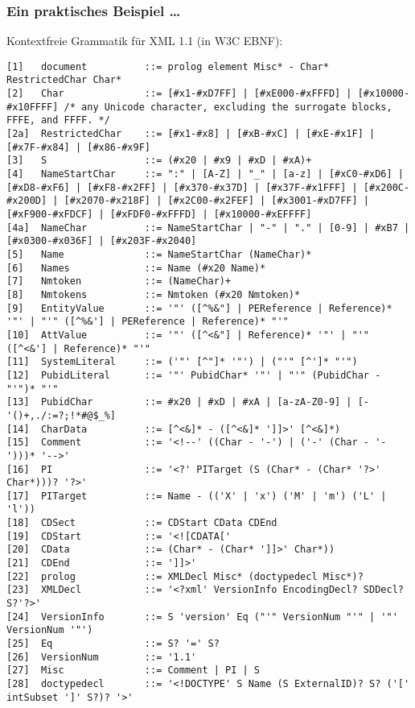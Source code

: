 \documentclass[onlymath]{beamer}
\begin{document}
\begin{frame}[fragile]\frametitle{Ein praktisches Beispiel \ldots}

\pause
Kontextfreie Grammatik für XML 1.1 (in W3C EBNF):

\linespread{0.6}
\fontsize{2.3}{4}\selectfont
\begin{verbatim}
[1]   document          ::= prolog element Misc* - Char* RestrictedChar Char*
[2]   Char              ::= [#x1-#xD7FF] | [#xE000-#xFFFD] | [#x10000-#x10FFFF] /* any Unicode character, excluding the surrogate blocks, FFFE, and FFFF. */
[2a]  RestrictedChar    ::= [#x1-#x8] | [#xB-#xC] | [#xE-#x1F] | [#x7F-#x84] | [#x86-#x9F]
[3]   S                 ::= (#x20 | #x9 | #xD | #xA)+
[4]   NameStartChar     ::= ":" | [A-Z] | "_" | [a-z] | [#xC0-#xD6] | [#xD8-#xF6] | [#xF8-#x2FF] | [#x370-#x37D] | [#x37F-#x1FFF] | [#x200C-#x200D] | [#x2070-#x218F] | [#x2C00-#x2FEF] | [#x3001-#xD7FF] | [#xF900-#xFDCF] | [#xFDF0-#xFFFD] | [#x10000-#xEFFFF]
[4a]  NameChar          ::= NameStartChar | "-" | "." | [0-9] | #xB7 | [#x0300-#x036F] | [#x203F-#x2040]
[5]   Name              ::= NameStartChar (NameChar)*
[6]   Names             ::= Name (#x20 Name)*
[7]   Nmtoken           ::= (NameChar)+
[8]   Nmtokens          ::= Nmtoken (#x20 Nmtoken)*
[9]   EntityValue       ::= '"' ([^%&"] | PEReference | Reference)* '"' | "'" ([^%&'] | PEReference | Reference)* "'"
[10]  AttValue          ::= '"' ([^<&"] | Reference)* '"' | "'" ([^<&'] | Reference)* "'"
[11]  SystemLiteral     ::= ('"' [^"]* '"') | ("'" [^']* "'")
[12]  PubidLiteral      ::= '"' PubidChar* '"' | "'" (PubidChar - "'")* "'"
[13]  PubidChar         ::= #x20 | #xD | #xA | [a-zA-Z0-9] | [-'()+,./:=?;!*#@$_%]
[14]  CharData          ::= [^<&]* - ([^<&]* ']]>' [^<&]*)
[15]  Comment           ::= '<!--' ((Char - '-') | ('-' (Char - '-')))* '-->'
[16]  PI                ::= '<?' PITarget (S (Char* - (Char* '?>' Char*)))? '?>'
[17]  PITarget          ::= Name - (('X' | 'x') ('M' | 'm') ('L' | 'l'))
[18]  CDSect            ::= CDStart CData CDEnd
[19]  CDStart           ::= '<![CDATA['
[20]  CData             ::= (Char* - (Char* ']]>' Char*))
[21]  CDEnd             ::= ']]>'
[22]  prolog            ::= XMLDecl Misc* (doctypedecl Misc*)?
[23]  XMLDecl           ::= '<?xml' VersionInfo EncodingDecl? SDDecl? S?'?>'
[24]  VersionInfo       ::= S 'version' Eq ("'" VersionNum "'" | '"' VersionNum '"')
[25]  Eq                ::= S? '=' S?
[26]  VersionNum        ::= '1.1'
[27]  Misc              ::= Comment | PI | S
[28]  doctypedecl       ::= '<!DOCTYPE' S Name (S ExternalID)? S? ('[' intSubset ']' S?)? '>'

\end{verbatim}
\end{frame}
\end{document}
